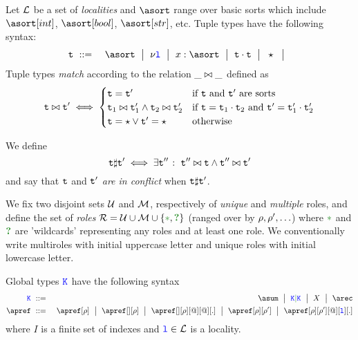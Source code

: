 %
Let $\mathcal{L}$ be a set of \emph{localities} and $\asort$ range over
basic sorts which include $\asort[int]$, $\asort[bool]$,
$\asort[str]$, etc.
%
Tuple types have the following syntax:
\begin{eqnarray*}
  \atuple & \bnfdef & \asort \bnfmid
                      \nu \aloc \bnfmid
                      x : \asort \bnfmid
                      \atuple \cdot \atuple \bnfmid
                      \wildcard \bnfmid
\end{eqnarray*}
%
Tuple types \emph{match} according to the relation $\_ \bowtie \_$ defined as
\[
  \texttt{t} \bowtie \texttt{t}' \iff
  \begin{cases}
    \texttt{t} = \texttt{t}'  & \text{if $\texttt{t}$ and $\texttt{t}'$ are sorts}
    \\
    \texttt{t}_1 \bowtie \texttt{t}'_1
    \land \texttt{t}_2 \bowtie \texttt{t}'_2  & \text{if } \texttt{t} = \texttt{t}_1 \cdot \texttt{t}_2 \text{ and }  \texttt{t}' = \texttt{t}'_1 \cdot \texttt{t}'_2
    \\
    \texttt{t} = \star \vee \texttt{t}' = \star & \text{otherwise}
  \end{cases}
\]

We define
\[
  \texttt{t} \sharp \texttt{t}' \iff \exists \texttt{t}'' \;\colon\; \texttt{t}'' \bowtie \texttt{t} \land \texttt{t}'' \bowtie \texttt{t}'
\]
%
and say that $\texttt{t}$ and $\texttt{t}'$ \emph{are in conflict} when
$\texttt{t} \sharp \texttt{t}'$.

We fix two disjoint sets $\mathcal{U}$ and $\mathcal{M}$, respectively
of \emph{unique} and \emph{multiple} roles, and define the set of
\emph{roles}
$\roleset = \unitroles \cup \multiroles \cup \{\unknownstar,
\unknown\}$ (ranged over by $\rho, \rho', \ldots$) where
$\unknownstar$ and $\unknown$ are 'wildcards' representing any roles
and at least one role.
%
We conventionally write multiroles with initial uppercase letter and
unique roles with initial lowercase letter.

Global types $\texttt{\textcolor{blue}K}$ have the following syntax
\begin{eqnarray*}
  \aK & \bnfdef & \asum \bnfmid
                  \aK \parop \aK \bnfmid
                  X \bnfmid
                  \arec
  \\
  \apref & \bnfdef & \apref[\arole] \bnfmid
                         \apref[{}][\arole] \bnfmid
                         \apref[{}][\arole][@][@][.] \bnfmid
                         \apref[\arole][\arole'] \bnfmid
                         \apref[\arole][\arole'][@][\aloc][.]
\end{eqnarray*}
where $I$ is a finite set of indexes and $\texttt{\color{blue}l} \in \mathcal{L}$ is a
locality.

